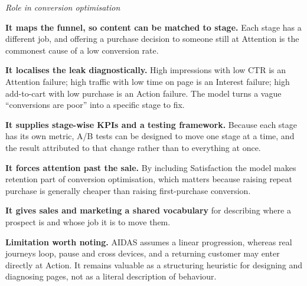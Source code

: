 \begin{qlist}
\textit{Role in conversion optimisation}
\begin{apts}\setcounter{enumi}{5}
\item \textbf{It maps the funnel, so content can be matched to stage.} Each
      stage has a different job, and offering a purchase decision to someone
      still at Attention is the commonest cause of a low conversion rate.
\item \textbf{It localises the leak diagnostically.} High impressions with low
      CTR is an Attention failure; high traffic with low time on page is an
      Interest failure; high add-to-cart with low purchase is an Action
      failure. The model turns a vague ``conversions are poor'' into a specific
      stage to fix.
\item \textbf{It supplies stage-wise KPIs and a testing framework.} Because
      each stage has its own metric, A/B tests can be designed to move one
      stage at a time, and the result attributed to that change rather than to
      everything at once.
\item \textbf{It forces attention past the sale.} By including Satisfaction the
      model makes retention part of conversion optimisation, which matters
      because raising repeat purchase is generally cheaper than raising
      first-purchase conversion.
\item \textbf{It gives sales and marketing a shared vocabulary} for describing
      where a prospect is and whose job it is to move them.
\end{apts}

\textbf{Limitation worth noting.} AIDAS assumes a linear progression, whereas
real journeys loop, pause and cross devices, and a returning customer may enter
directly at Action. It remains valuable as a structuring heuristic for
designing and diagnosing pages, not as a literal description of behaviour.


\end{qlist}
